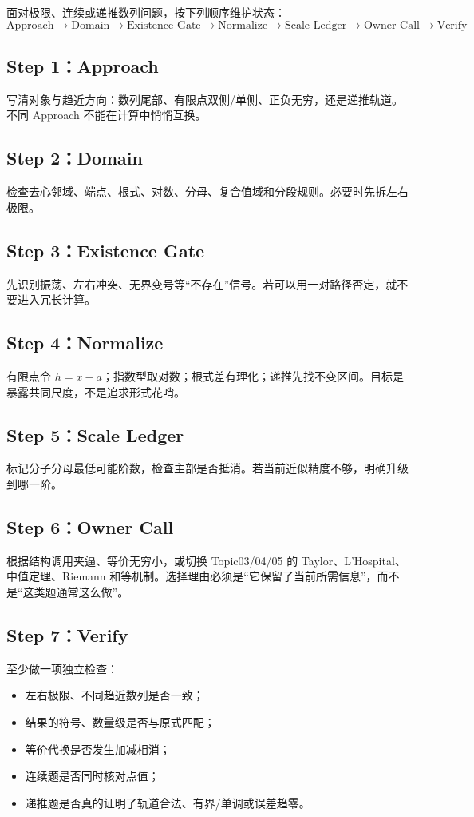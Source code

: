 \documentclass[11pt,a4paper]{ctexart}
\begin{document}
面对极限、连续或递推数列问题，按下列顺序维护状态：
\[
\boxed{
\text{Approach}
\to \text{Domain}
\to \text{Existence Gate}
\to \text{Normalize}
\to \text{Scale Ledger}
\to \text{Owner Call}
\to \text{Verify}}
\]

\subsection{Step 1：Approach}
写清对象与趋近方向：数列尾部、有限点双侧/单侧、正负无穷，还是递推轨道。不同 Approach 不能在计算中悄悄互换。

\subsection{Step 2：Domain}
检查去心邻域、端点、根式、对数、分母、复合值域和分段规则。必要时先拆左右极限。

\subsection{Step 3：Existence Gate}
先识别振荡、左右冲突、无界变号等“不存在”信号。若可以用一对路径否定，就不要进入冗长计算。

\subsection{Step 4：Normalize}
有限点令 $h=x-a$；指数型取对数；根式差有理化；递推先找不变区间。目标是暴露共同尺度，不是追求形式花哨。

\subsection{Step 5：Scale Ledger}
标记分子分母最低可能阶数，检查主部是否抵消。若当前近似精度不够，明确升级到哪一阶。

\subsection{Step 6：Owner Call}
根据结构调用夹逼、等价无穷小，或切换 Topic03/04/05 的 Taylor、L'Hospital、中值定理、Riemann 和等机制。选择理由必须是“它保留了当前所需信息”，而不是“这类题通常这么做”。

\subsection{Step 7：Verify}
至少做一项独立检查：
\begin{itemize}
  \item 左右极限、不同趋近数列是否一致；
  \item 结果的符号、数量级是否与原式匹配；
  \item 等价代换是否发生加减相消；
  \item 连续题是否同时核对点值；
  \item 递推题是否真的证明了轨道合法、有界/单调或误差趋零。
\end{itemize}
\end{document}
